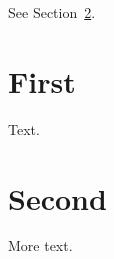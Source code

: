 \documentclass{article}
\begin{document}
See Section~\ref{sec:later}.

\section{First}
Text.

\section{Second}\label{sec:later}
More text.
\end{document}
